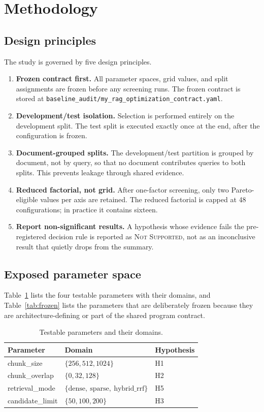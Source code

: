 \documentclass[11pt,a4paper]{article}
\begin{document}
\section{Methodology}

\subsection{Design principles}
The study is governed by five design principles.

\begin{enumerate}[leftmargin=1.5em,itemsep=0.15em]
  \item \textbf{Frozen contract first.} All parameter spaces, grid
    values, and split assignments are frozen before any screening
    runs. The frozen contract is stored at
    \texttt{baseline\_audit/my\_rag\_optimization\_contract.yaml}.
  \item \textbf{Development/test isolation.} Selection is performed
    entirely on the development split. The test split is executed
    exactly once at the end, after the configuration is frozen.
  \item \textbf{Document-grouped splits.} The development/test
    partition is grouped by document, not by query, so that no
    document contributes queries to both splits. This prevents
    leakage through shared evidence.
  \item \textbf{Reduced factorial, not grid.} After one-factor
    screening, only two Pareto-eligible values per axis are
    retained. The reduced factorial is capped at \num{48}
    configurations; in practice it contains sixteen.
  \item \textbf{Report non-significant results.} A hypothesis whose
    evidence fails the pre-registered decision rule is reported as
    \textsc{Not Supported}, not as an inconclusive result that
    quietly drops from the summary.
\end{enumerate}

\subsection{Exposed parameter space}
Table~\ref{tab:params} lists the four testable parameters with
their domains, and Table~\ref{tab:frozen} lists the parameters that
are deliberately frozen because they are architecture-defining or
part of the shared program contract.

\begin{table}[h]
\centering
\caption{Testable parameters and their domains.}
\label{tab:params}
\small
\begin{tabular}{l l l}
\toprule
\textbf{Parameter} & \textbf{Domain} & \textbf{Hypothesis} \\
\midrule
chunk\_size         & $\{256, 512, 1024\}$     & H1 \\
chunk\_overlap      & $\{0, 32, 128\}$         & H2 \\
retrieval\_mode     & $\{\text{dense},\ \text{sparse},\ \text{hybrid\_rrf}\}$ & H5 \\
candidate\_limit    & $\{50, 100, 200\}$       & H3 \\
\bottomrule
\end{tabular}
\end{table}
\end{document}

